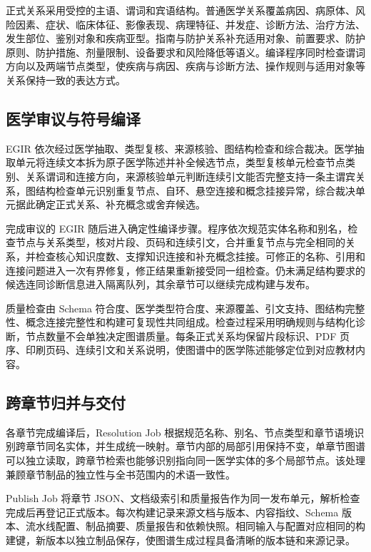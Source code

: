 正式关系采用受控的主语、谓词和宾语结构。普通医学关系覆盖病因、病原体、风险因素、症状、临床体征、影像表现、病理特征、并发症、诊断方法、治疗方法、发生部位、鉴别对象和疾病亚型。指南与防护关系补充适用对象、前置要求、防护原则、防护措施、剂量限制、设备要求和风险降低等语义。编译程序同时检查谓词方向以及两端节点类型，使疾病与病因、疾病与诊断方法、操作规则与适用对象等关系保持一致的表达方式。

\subsection{医学审议与符号编译}

EGIR 依次经过医学抽取、类型复核、来源核验、图结构检查和综合裁决。医学抽取单元将连续文本拆为原子医学陈述并补全候选节点，类型复核单元检查节点类别、关系谓词和连接方向，来源核验单元判断连续引文能否完整支持一条主谓宾关系，图结构检查单元识别重复节点、自环、悬空连接和概念挂接异常，综合裁决单元据此确定正式关系、补充概念或舍弃候选。

完成审议的 EGIR 随后进入确定性编译步骤。程序依次规范实体名称和别名，检查节点与关系类型，核对片段、页码和连续引文，合并重复节点与完全相同的关系，并检查核心知识度数、支撑知识连接和补充概念挂接。可修正的名称、引用和连接问题进入一次有界修复，修正结果重新接受同一组检查。仍未满足结构要求的候选连同诊断信息进入隔离队列，其余章节可以继续完成构建与发布。

质量检查由 Schema 符合度、医学类型符合度、来源覆盖、引文支持、图结构完整性、概念连接完整性和构建可复现性共同组成。检查过程采用明确规则与结构化诊断，节点数量不会单独决定图谱质量。每条正式关系均保留片段标识、PDF 页序、印刷页码、连续引文和关系说明，使图谱中的医学陈述能够定位到对应教材内容。

\subsection{跨章节归并与交付}

各章节完成编译后，Resolution Job 根据规范名称、别名、节点类型和章节语境识别跨章节同名实体，并生成统一映射。章节内部的局部引用保持不变，单章节图谱可以独立读取，跨章节检索也能够识别指向同一医学实体的多个局部节点。该处理兼顾章节制品的独立性与全书范围内的术语一致性。

Publish Job 将章节 JSON、文档级索引和质量报告作为同一发布单元，解析检查完成后再登记正式版本。每次构建记录来源文档与版本、内容指纹、Schema 版本、流水线配置、制品摘要、质量报告和依赖快照。相同输入与配置对应相同的构建键，新版本以独立制品保存，使图谱生成过程具备清晰的版本链和来源记录\cite{w3c-prov-dm}。

